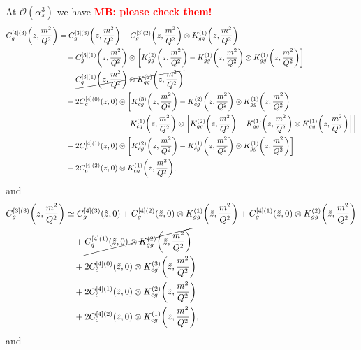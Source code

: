 \documentclass[a4paper,10pt]{article}
\newcommand{\zapp}{\tilde z}
\newcommand{\as}{\alpha_s}
\newcommand{\Ord}{\mathcal{O}}
\let\originalleft\left
\let\originalright\right
\renewcommand{\left}{\mathopen{}\mathclose\bgroup\originalleft}
\renewcommand{\right}{\aftergroup\egroup\originalright}
\def\({\left(}
\def\){\right)}
\def\[{\left[}
\def\]{\right]}
\newcommand{\MB}[1]{\textbf{\textcolor{red}   {MB: #1}}}
\begin{document}
At $\Ord(\as^3)$ we have \MB{please check them!}
\begin{align}\label{eq:C43}
C_g^{[4](3)}\(z,\frac{m^2}{Q^2}\)
&= C_g^{[3](3)}\(z,\frac{m^2}{Q^2}\)
-C_g^{[3](2)}\(z,\frac{m^2}{Q^2}\)\otimes K_{gg}^{(1)}\(z,\frac{m^2}{Q^2}\)
\nonumber\\ &\quad
-C_g^{[3](1)}\(z,\frac{m^2}{Q^2}\)\otimes \[K_{gg}^{(2)}\(z,\frac{m^2}{Q^2}\)-K_{gg}^{(1)}\(z,\frac{m^2}{Q^2}\)\otimes K_{gg}^{(1)}\(z,\frac{m^2}{Q^2}\)\]
\nonumber\\ &\quad
-\cancel{C_q^{[3](1)}\(z,\frac{m^2}{Q^2}\)\otimes K_{qg}^{(2)}\(z,\frac{m^2}{Q^2}\)}
\nonumber\\ &\quad
-2C_c^{[4](0)}(z,0)\otimes \bigg[K_{cg}^{(3)}\(z,\frac{m^2}{Q^2}\)-K_{cg}^{(2)}\(z,\frac{m^2}{Q^2}\)\otimes K_{gg}^{(1)}\(z,\frac{m^2}{Q^2}\)
\nonumber\\ &\qquad\qquad\qquad\qquad
-K_{cg}^{(1)}\(z,\frac{m^2}{Q^2}\)\otimes \[K_{gg}^{(2)}\(z,\frac{m^2}{Q^2}\) - K_{gg}^{(1)}\(z,\frac{m^2}{Q^2}\) \otimes K_{gg}^{(1)}\(z,\frac{m^2}{Q^2}\)\]\bigg]
\nonumber\\ &\quad
-2C_c^{[4](1)}(z,0)\otimes \[K_{cg}^{(2)}\(z,\frac{m^2}{Q^2}\)-K_{cg}^{(1)}\(z,\frac{m^2}{Q^2}\)\otimes K_{gg}^{(1)}\(z,\frac{m^2}{Q^2}\)\]
\nonumber\\ &\quad
-2C_c^{[4](2)}(z,0)\otimes K_{cg}^{(1)}\(z,\frac{m^2}{Q^2}\),
\end{align}
and
\begin{align}\label{eq:C33}
C_g^{[3](3)}\(z,\frac{m^2}{Q^2}\)
&\simeq C_g^{[4](3)}\(\zapp,0\) +C_g^{[4](2)}\(\zapp,0\)\otimes K_{gg}^{(1)}\(\zapp,\frac{m^2}{Q^2}\)
  +C_g^{[4](1)}\(\zapp,0\)\otimes K_{gg}^{(2)}\(\zapp,\frac{m^2}{Q^2}\)
\nonumber\\ &\quad
  +\cancel{C_q^{[4](1)}\(\zapp,0\)\otimes K_{qg}^{(2)}\(\zapp,\frac{m^2}{Q^2}\)}
\nonumber\\ &\quad
+2C_c^{[4](0)}(\zapp,0)\otimes K_{cg}^{(3)}\(\zapp,\frac{m^2}{Q^2}\)
\nonumber\\ &\quad
+2C_c^{[4](1)}(\zapp,0)\otimes K_{cg}^{(2)}\(\zapp,\frac{m^2}{Q^2}\)
\nonumber\\ &\quad
+2C_c^{[4](2)}(\zapp,0)\otimes K_{cg}^{(1)}\(\zapp,\frac{m^2}{Q^2}\),
\end{align}
and
\end{document}

